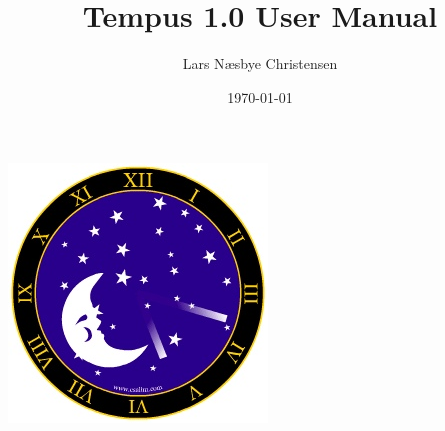\documentclass[11pt]{article}
\begin{document}
\begin{titlepage}

\title{Tempus 1.0 User Manual}
\begin{center}
\includegraphics[scale=0.5]{../resources/moonStarsClock.jpg}
\end{center}
\author{Lars N{\ae}sbye Christensen}
\date{\today}
\end{titlepage}
\maketitle
\pagebreak

\tableofcontents
\pagebreak


\pagebreak


\pagebreak


\pagebreak


\pagebreak


\pagebreak


\pagebreak


\end{document}

